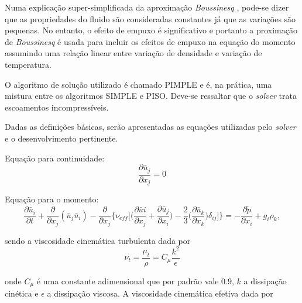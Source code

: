 \documentclass[12pt,openright,twoside,a4paper,english,french,spanish,brazil]{abntex2}
\begin{document}
Numa explicação super-simplificada da aproximação  
\textit{Boussinesq} \cite{Gray76}, pode-se dizer que as propriedades do fluido 
são consideradas constantes já que as variações são pequenas. No entanto, o efeito 
de empuxo é significativo e portanto a proximação de \textit{Boussinesq} é usada para 
incluir os efeitos de empuxo na equação do momento assumindo uma relação linear entre 
variação de densidade e variação de temperatura. 


O algoritmo de solução utilizado é chamado PIMPLE e é, na prática, uma mistura entre os algoritmos 
SIMPLE e PISO. Deve-se ressaltar que o \textit{solver} trata escoamentos incompressíveis.

Dadas as definições básicas, serão apresentadas as equações utilizadas pelo \textit{solver} e o desenvolvimento 
pertinente.

Equação para continuidade:
\begin{equation}
\label{eq:continuidade}
\frac{\partial \bar{u}_j}{\partial x_j}=0
\end{equation}

Equação para o momento:
\begin{equation}
\label{eq:momento}
\frac{\partial \bar{u}_i}{\partial t}+\frac{\partial}{\partial x_j}
(\bar{u}_j\bar{u}_i)-\frac{\partial}{\partial x_j}\bigg\{\nu_{eff}\bigg[
\bigg(\frac{\partial \bar{u}i}{\partial x_j}+\frac{\partial\bar{u}_j}{\partial x_i}\bigg)
-\frac{2}{3}\bigg(\frac{\partial \bar{u}_k}{\partial x_k}\bigg)
\delta_{ij}\bigg]\bigg\}=
-\frac{\partial \tilde{p}}{\partial x_i}+g_i\rho_k,
\end{equation}

sendo a viscosidade cinemática turbulenta dada por
\begin{equation}
\label{eq:vtur}
\nu_{t}=\frac{\mu_t}{\rho}=C_\mu \frac{k^2}{\epsilon}
\end{equation}

onde $C_\mu$ é uma constante adimensional que por padrão vale $0.9$, $k$ a dissipação cinética e 
$\epsilon$ a dissipação viscosa. A viscosidade cinemática efetiva dada por
\end{document}

